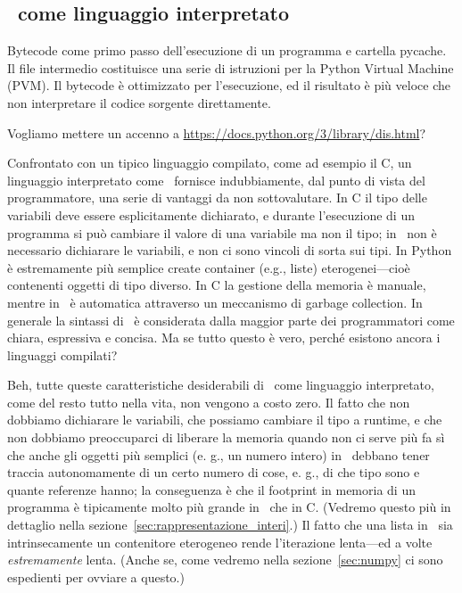 
\subsection{\python\ come linguaggio interpretato}

Bytecode come primo passo dell'esecuzione di un programma e cartella pycache.
Il file intermedio costituisce una serie di istruzioni per la Python Virtual Machine (PVM).
Il bytecode \`e ottimizzato per l'esecuzione, ed il risultato \`e pi\`u veloce che
non interpretare il codice sorgente direttamente.

Vogliamo mettere un accenno a \url{https://docs.python.org/3/library/dis.html}?

Confrontato con un tipico linguaggio compilato, come ad esempio il C, un linguaggio
interpretato come \python\ fornisce indubbiamente, dal punto di vista del programmatore,
una serie di vantaggi da non sottovalutare. In C il tipo delle variabili deve essere
esplicitamente dichiarato, e durante l'esecuzione di un programma si pu\`o cambiare
il valore di una variabile ma non il tipo; in \python\ non \`e necessario dichiarare
le variabili, e non ci sono vincoli di sorta sui tipi. In Python \`e estremamente
pi\`u semplice create container (e.g., liste) eterogenei---cio\`e contenenti oggetti
di tipo diverso. In C la gestione della memoria \`e manuale, mentre in \python\
\`e automatica attraverso un meccanismo di garbage collection. In generale la sintassi
di \python\ \`e considerata dalla maggior parte dei programmatori come chiara, espressiva
e concisa. Ma se tutto questo \`e vero, perch\'e esistono ancora i linguaggi compilati?

Beh, tutte queste caratteristiche desiderabili di \python\ come linguaggio interpretato,
come del resto tutto nella vita, non vengono a costo zero. Il fatto che non dobbiamo
dichiarare le variabili, che possiamo cambiare il tipo a runtime, e che non dobbiamo
preoccuparci di liberare la memoria quando non ci serve pi\`u fa s\`i che anche
gli oggetti pi\`u semplici (e. g., un numero intero) in \python\ debbano tener traccia
autonomamente di un certo numero di cose, e. g., di che tipo sono e quante referenze
hanno; la conseguenza \`e che il footprint in memoria di un programma \`e tipicamente
molto pi\`u grande in \python\ che in C. (Vedremo questo pi\`u in dettaglio nella
sezione~\ref{sec:rappresentazione_interi}.) Il fatto che una lista in \python\ sia
intrinsecamente un contenitore eterogeneo rende l'iterazione lenta---ed a volte
\emph{estremamente} lenta. (Anche se, come vedremo nella sezione~\ref{sec:numpy}
ci sono espedienti per ovviare a questo.)

